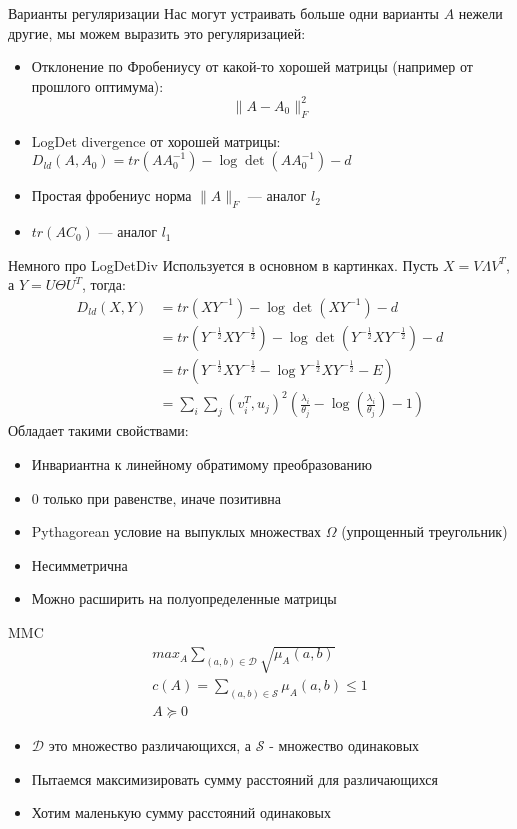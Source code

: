 \documentclass[14pt, fleqn, xcolor={dvipsnames, table}]{beamer}
\begin{document}
\begin{frame}{Варианты регуляризации}
Нас могут устраивать больше одни варианты $A$ нежели другие, мы можем выразить это регуляризацией:
\begin{itemize}
  \item Отклонение по Фробениусу от какой-то хорошей матрицы (например от прошлого оптимума):
  $$
  \|A - A_0\|_F^2
  $$
  \item LogDet divergence от хорошей матрицы: $D_{ld}(A,A_0) = tr(AA_0^{-1}) - \log \det(AA_0^{-1}) - d$
  \item Простая фробениус норма $\|A\|_F$ --- аналог $l_2$
  \item $tr(AC_0)$ --- аналог $l_1$
\end{itemize}
\end{frame}

\begin{frame}{Немного про LogDetDiv}
\footnotesize
Используется в основном в картинках. Пусть $X = V \Lambda V^T$, а $Y = U \Theta U^T$, тогда:
$$\begin{array}{rl}
D_{ld}(X,Y) &= tr(XY^{-1}) - \log \det(XY^{-1}) - d \\
&= tr(Y^{-\frac{1}{2}}XY^{-\frac{1}{2}})  - \log \det (Y^{-\frac{1}{2}}XY^{-\frac{1}{2}}) - d \\
&= tr(Y^{-\frac{1}{2}}XY^{-\frac{1}{2}} - \log Y^{-\frac{1}{2}}XY^{-\frac{1}{2}} - E) \\
&= \sum_i\sum_j(v^T_i, u_j)^2\left(\frac{\lambda_i}{\theta_j} - \log(\frac{\lambda_i}{\theta_j}) - 1\right)
\end{array}$$
Обладает такими свойствами:
\begin{itemize}
\item Инвариантна к линейному обратимому преобразованию
\item 0 только при равенстве, иначе позитивна
\item Pythagorean условие на выпуклых множествах $\Omega$ (упрощенный треугольник)
\item Несимметрична
\item Можно расширить на полуопределенные матрицы
\end{itemize}
\end{frame}

\begin{frame}{MMC}
$$\begin{array}{l}
max_A \sum_{(a, b) \in \mathcal{D}} \sqrt{\mu_A(a, b)} \\
c(A) = \sum_{(a, b) \in \mathcal{S}} \mu_A(a, b) \le 1 \\
A \succeq 0
\end{array}$$

\begin{itemize}
  \item $\mathcal{D}$ это множество различающихся, а $\mathcal{S}$ - множество одинаковых
  \item Пытаемся максимизировать сумму расстояний для различающихся
  \item Хотим маленькую сумму расстояний одинаковых
\end{itemize}
\end{frame}
\end{document}
